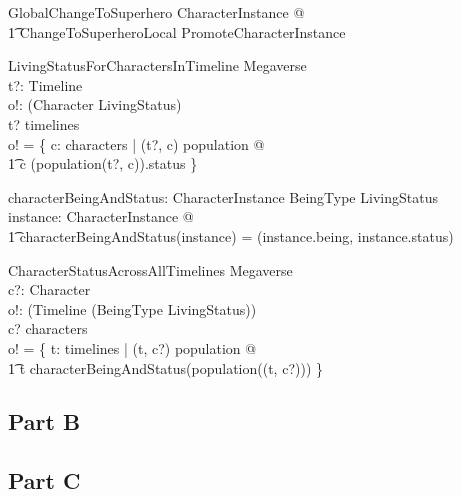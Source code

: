 \documentclass{article}
\begin{document}
\begin{zed}
GlobalChangeToSuperhero  \exists \Delta CharacterInstance @ \\
\t1 ChangeToSuperheroLocal \land PromoteCharacterInstance \\
\end{zed}

\begin{schema}{LivingStatusForCharactersInTimeline}
\Xi Megaverse \\
t?: Timeline \\ 
o!: \power (Character \cross LivingStatus) \\
\where 
t? \in timelines \\
o! = \{ c: characters | (t?, c) \in \dom population @ \\
\t1 c \mapsto (population(t?, c)).status 
\} \\ 
\end{schema}

\begin{axdef}
characterBeingAndStatus: CharacterInstance \fun BeingType \cross LivingStatus \\
\where
\forall instance: CharacterInstance @ \\
\t1 characterBeingAndStatus(instance) = (instance.being, instance.status) \\
\end{axdef} 

\begin{schema}{CharacterStatusAcrossAllTimelines}
\Xi Megaverse \\
c?: Character \\ 
o!: \power (Timeline \cross (BeingType \cross LivingStatus)) \\
\where 
c? \in characters \\
o! = \{ t: timelines | (t, c?) \in \dom population @ \\
\t1 t \mapsto characterBeingAndStatus(population((t, c?))) 
\} \\ 
\end{schema}

\pagebreak

\subsection*{Part B}

\pagebreak

\subsection*{Part C}
\end{document}
